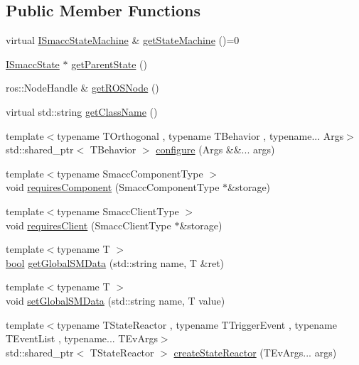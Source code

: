 \subsection*{Public Member Functions}
\begin{DoxyCompactItemize}
\item 
virtual \hyperlink{classsmacc_1_1ISmaccStateMachine}{I\+Smacc\+State\+Machine} \& \hyperlink{classsmacc_1_1ISmaccState_a562bb3f9a3ac16b8be71e4794c9e7523}{get\+State\+Machine} ()=0
\item 
\hyperlink{classsmacc_1_1ISmaccState}{I\+Smacc\+State} $\ast$ \hyperlink{classsmacc_1_1ISmaccState_a3484b4a32ef47a8650f08df67de4fae5}{get\+Parent\+State} ()
\item 
ros\+::\+Node\+Handle \& \hyperlink{classsmacc_1_1ISmaccState_a5d3f13b9d7ae7fdcf9da21c4ed935706}{get\+R\+O\+S\+Node} ()
\item 
virtual std\+::string \hyperlink{classsmacc_1_1ISmaccState_a5bf0b49d5ea6b9e8f45c26fa155b2664}{get\+Class\+Name} ()
\item 
{\footnotesize template$<$typename T\+Orthogonal , typename T\+Behavior , typename... Args$>$ }\\std\+::shared\+\_\+ptr$<$ T\+Behavior $>$ \hyperlink{classsmacc_1_1ISmaccState_ad129c58b69a90e7056f2b3c3fa139a24}{configure} (Args \&\&... args)
\item 
{\footnotesize template$<$typename Smacc\+Component\+Type $>$ }\\void \hyperlink{classsmacc_1_1ISmaccState_afd5264c36403d22e124eea89a0122e59}{requires\+Component} (Smacc\+Component\+Type $\ast$\&storage)
\item 
{\footnotesize template$<$typename Smacc\+Client\+Type $>$ }\\void \hyperlink{classsmacc_1_1ISmaccState_a7f95c9f0a6ea2d6f18d1aec0519de4ac}{requires\+Client} (Smacc\+Client\+Type $\ast$\&storage)
\item 
{\footnotesize template$<$typename T $>$ }\\\hyperlink{classbool}{bool} \hyperlink{classsmacc_1_1ISmaccState_ad6811b03329d9e694e78bc4b1220c2c0}{get\+Global\+S\+M\+Data} (std\+::string name, T \&ret)
\item 
{\footnotesize template$<$typename T $>$ }\\void \hyperlink{classsmacc_1_1ISmaccState_a120fcda41b44a437ff2e3906ac9fa5ca}{set\+Global\+S\+M\+Data} (std\+::string name, T value)
\item 
{\footnotesize template$<$typename T\+State\+Reactor , typename T\+Trigger\+Event , typename T\+Event\+List , typename... T\+Ev\+Args$>$ }\\std\+::shared\+\_\+ptr$<$ T\+State\+Reactor $>$ \hyperlink{classsmacc_1_1ISmaccState_a5b071f3034e2a0416d87ff26332f598f}{create\+State\+Reactor} (T\+Ev\+Args... args)

\end{DoxyCompactItemize}
